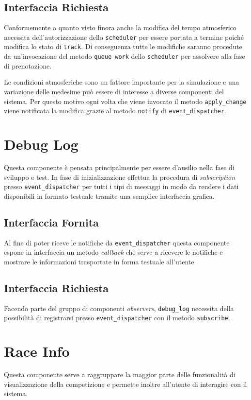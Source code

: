 \documentclass[11pt,a4paper]{report}
\newcommand{\fun}[1]{\texttt{#1}}
\begin{document}
\subsection*{Interfaccia Richiesta}
Conformemente a quanto visto finora anche la modifica del tempo atmosferico necessita dell'autorizzazione dello \texttt{scheduler} per essere portata a termine poiché modifica lo stato di \texttt{track}. Di conseguenza tutte le modifiche saranno procedute da un'invocazione del metodo \fun{queue\_work} dello \texttt{scheduler} per assolvere alla fase di prenotazione.

Le condizioni atmosferiche sono un fattore importante per la simulazione e una variazione delle medesime può essere di interesse a diverse componenti del sistema. Per questo motivo ogni volta che viene invocato il metodo \fun{apply\_change} viene notificata la modifica grazie al metodo \fun{notify} di \texttt{event\_dispatcher}.

\section{Debug Log}
Questa componente è pensata principalmente per essere d'ausilio nella fase di sviluppo e test. In fase di inizializzazione effettua la procedura di \textit{subscription} presso \texttt{event\_dispatcher} per tutti i tipi di messaggi in modo da rendere i dati disponibili in formato testuale tramite una semplice interfaccia grafica.

\subsection*{Interfaccia Fornita}
Al fine di poter riceve le notifiche da \texttt{event\_dispatcher} questa componente espone in interfaccia un metodo \textit{callback} che serve a ricevere le notifiche e mostrare le informazioni trasportate in forma testuale all'utente.

\subsection*{Interfaccia Richiesta}
Facendo parte del gruppo di componenti \textit{observers}, \texttt{debug\_log} necessita della possibilità di registrarsi presso \texttt{event\_dispatcher} con il metodo \fun{subscribe}.

\section{Race Info}
Questa componente serve a raggruppare la maggior parte delle funzionalità di visualizzazione della competizione e permette inoltre all'utente di interagire con il sistema.
\end{document}
